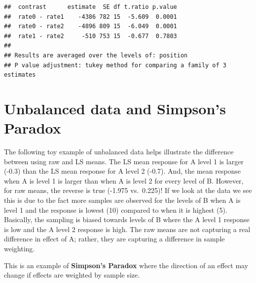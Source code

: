 \documentclass[
]{book}
\begin{document}
\begin{verbatim}
##  contrast      estimate  SE df t.ratio p.value
##  rate0 - rate1    -4386 782 15  -5.609  0.0001
##  rate0 - rate2    -4896 809 15  -6.049  0.0001
##  rate1 - rate2     -510 753 15  -0.677  0.7803
## 
## Results are averaged over the levels of: position 
## P value adjustment: tukey method for comparing a family of 3 estimates
\end{verbatim}

\hypertarget{unbalanced-data-and-simpsons-paradox}{%
\section{Unbalanced data and Simpson's Paradox}\label{unbalanced-data-and-simpsons-paradox}}

The following toy example of unbalanced data helps illustrate the difference between using raw and LS means. The LS mean response for A level 1 is larger (-0.3) than the LS mean response for A level 2 (-0.7). And, the mean response when A is level 1 is larger than when A is level 2 for every level of B. However, for raw means, the reverse is true (-1.975 vs.~0.225)! If we look at the data we see this is due to the fact more samples are observed for the levels of B when A is level 1 and the response is lowest (10) compared to when it is highest (5). Basically, the sampling is biased towards levels of B where the A level 1 response is low and the A level 2 response is high. The raw means are not capturing a real difference in effect of A; rather, they are capturing a difference in sample weighting.

This is an example of \textbf{Simpson's Paradox} where the direction of an effect may change if effects are weighted by sample size.
\end{document}
